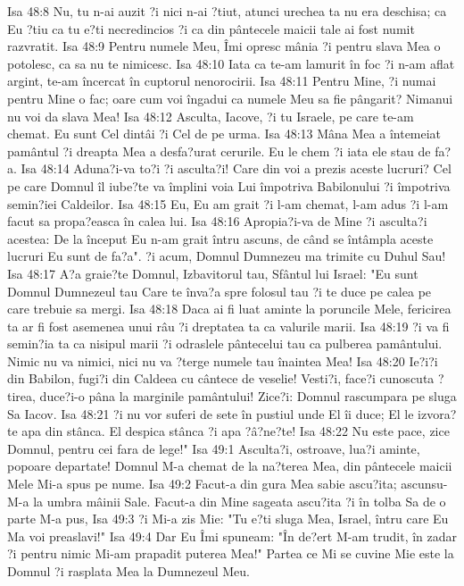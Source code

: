 Isa 48:8  Nu, tu n-ai auzit ?i nici n-ai ?tiut, atunci urechea ta nu era deschisa; ca Eu ?tiu ca tu e?ti necredincios ?i ca din pântecele maicii tale ai fost numit razvratit.
Isa 48:9  Pentru numele Meu, Îmi opresc mânia ?i pentru slava Mea o potolesc, ca sa nu te nimicesc.
Isa 48:10  Iata ca te-am lamurit în foc ?i n-am aflat argint, te-am încercat în cuptorul nenorocirii.
Isa 48:11  Pentru Mine, ?i numai pentru Mine o fac; oare cum voi îngadui ca numele Meu sa fie pângarit? Nimanui nu voi da slava Mea!
Isa 48:12  Asculta, Iacove, ?i tu Israele, pe care te-am chemat. Eu sunt Cel dintâi ?i Cel de pe urma.
Isa 48:13  Mâna Mea a întemeiat pamântul ?i dreapta Mea a desfa?urat cerurile. Eu le chem ?i iata ele stau de fa?a.
Isa 48:14  Aduna?i-va to?i ?i asculta?i! Care din voi a prezis aceste lucruri? Cel pe care Domnul îl iube?te va împlini voia Lui împotriva Babilonului ?i împotriva semin?iei Caldeilor.
Isa 48:15  Eu, Eu am grait ?i l-am chemat, l-am adus ?i l-am facut sa propa?easca în calea lui.
Isa 48:16  Apropia?i-va de Mine ?i asculta?i acestea: De la început Eu n-am grait întru ascuns, de când se întâmpla aceste lucruri Eu sunt de fa?a". ?i acum, Domnul Dumnezeu ma trimite cu Duhul Sau!
Isa 48:17  A?a graie?te Domnul, Izbavitorul tau, Sfântul lui Israel: "Eu sunt Domnul Dumnezeul tau Care te înva?a spre folosul tau ?i te duce pe calea pe care trebuie sa mergi.
Isa 48:18  Daca ai fi luat aminte la poruncile Mele, fericirea ta ar fi fost asemenea unui râu ?i dreptatea ta ca valurile marii.
Isa 48:19  ?i va fi semin?ia ta ca nisipul marii ?i odraslele pântecelui tau ca pulberea pamântului. Nimic nu va nimici, nici nu va ?terge numele tau înaintea Mea!
Isa 48:20  Ie?i?i din Babilon, fugi?i din Caldeea cu cântece de veselie! Vesti?i, face?i cunoscuta ?tirea, duce?i-o pâna la marginile pamântului! Zice?i: Domnul rascumpara pe sluga Sa Iacov.
Isa 48:21  ?i nu vor suferi de sete în pustiul unde El îi duce; El le izvora?te apa din stânca. El despica stânca ?i apa ?â?ne?te!
Isa 48:22  Nu este pace, zice Domnul, pentru cei fara de lege!"
Isa 49:1  Asculta?i, ostroave, lua?i aminte, popoare departate! Domnul M-a chemat de la na?terea Mea, din pântecele maicii Mele Mi-a spus pe nume.
Isa 49:2  Facut-a din gura Mea sabie ascu?ita; ascunsu-M-a la umbra mâinii Sale. Facut-a din Mine sageata ascu?ita ?i în tolba Sa de o parte M-a pus,
Isa 49:3  ?i Mi-a zis Mie: "Tu e?ti sluga Mea, Israel, întru care Eu Ma voi preaslavi!"
Isa 49:4  Dar Eu Îmi spuneam: "În de?ert M-am trudit, în zadar ?i pentru nimic Mi-am prapadit puterea Mea!" Partea ce Mi se cuvine Mie este la Domnul ?i rasplata Mea la Dumnezeul Meu.
